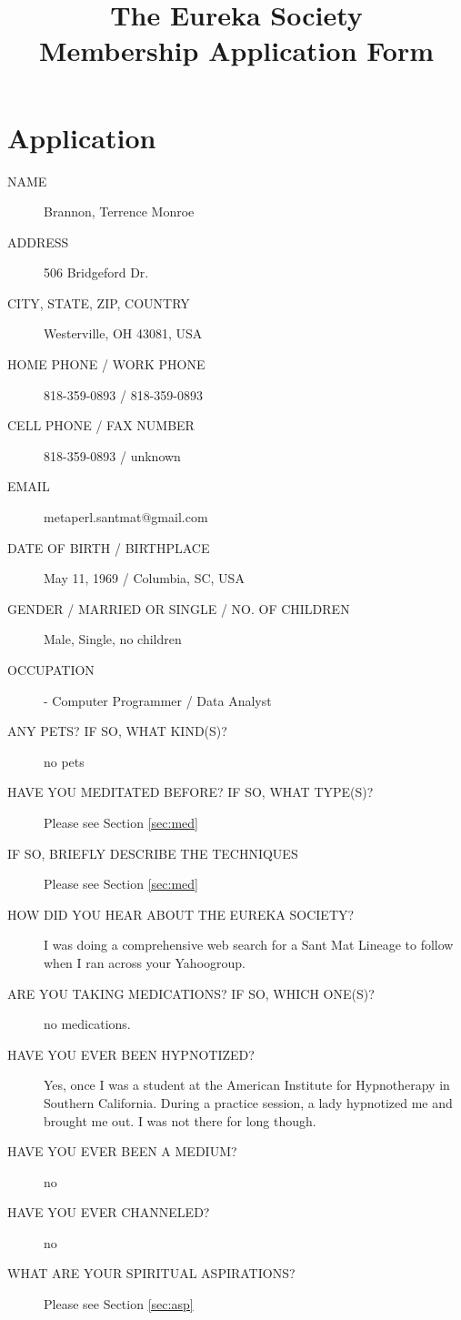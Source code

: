 \documentclass[12pt]{article}%
\begin{document}
\title{The Eureka Society \\ Membership Application Form}
\maketitle

\tableofcontents


\section{Application}

\begin{description}
	\item[NAME] Brannon, Terrence Monroe 
	\item[ADDRESS] 506 Bridgeford Dr.
	\item[CITY, STATE, ZIP, COUNTRY] Westerville, OH 43081, USA
	\item[HOME PHONE / WORK PHONE] 818-359-0893 / 818-359-0893
	\item[CELL PHONE / FAX NUMBER] 818-359-0893 / unknown
	\item[EMAIL] metaperl.santmat@gmail.com
	\item[DATE OF BIRTH / BIRTHPLACE] May 11, 1969 / Columbia, SC, USA
	\item[GENDER / MARRIED OR SINGLE / NO. OF CHILDREN] Male, Single, no children
	\item[OCCUPATION] - Computer Programmer / Data Analyst
	\item[ANY PETS?  IF SO, WHAT KIND(S)?] no pets
	\item[HAVE YOU MEDITATED BEFORE?  IF SO, WHAT TYPE(S)?] Please see Section \ref{sec:med}
	\item[IF SO, BRIEFLY DESCRIBE THE TECHNIQUES] Please see Section \ref{sec:med}
	\item[HOW DID YOU HEAR ABOUT THE EUREKA SOCIETY?] I was doing a comprehensive web search for a Sant Mat Lineage to follow when I ran across your Yahoogroup.
	\item[ARE YOU TAKING MEDICATIONS?  IF SO, WHICH ONE(S)?] no medications.
	\item[HAVE YOU EVER BEEN HYPNOTIZED?] Yes, once I was a student at the American Institute for Hypnotherapy in Southern California. During a practice session, a lady hypnotized me and brought me out. I was not there for long though.
	\item[HAVE YOU EVER BEEN A MEDIUM?] no
	\item[HAVE YOU EVER CHANNELED?] no
	\item[WHAT ARE YOUR SPIRITUAL ASPIRATIONS?]  Please see Section \ref{sec:asp}

\end{description}
\end{document}
